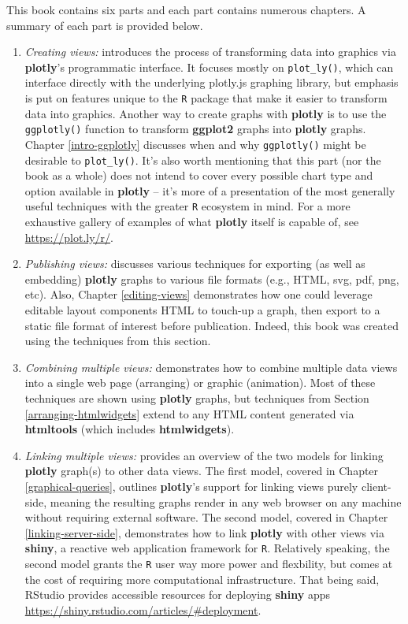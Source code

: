 \documentclass[
  12pt,
]{krantz}
\begin{document}
This book contains six parts and each part contains numerous chapters. A summary of each part is provided below.

\begin{enumerate}
\def\labelenumi{\arabic{enumi}.}
\item
  \emph{Creating views:} introduces the process of transforming data into graphics via \textbf{plotly}'s programmatic interface. It focuses mostly on \texttt{plot\_ly()}, which can interface directly with the underlying plotly.js graphing library, but emphasis is put on features unique to the \texttt{R} package that make it easier to transform data into graphics. Another way to create graphs with \textbf{plotly} is to use the \texttt{ggplotly()} function to transform \textbf{ggplot2} graphs into \textbf{plotly} graphs. Chapter \ref{intro-ggplotly} discusses when and why \texttt{ggplotly()} might be desirable to \texttt{plot\_ly()}. It's also worth mentioning that this part (nor the book as a whole) does not intend to cover every possible chart type and option available in \textbf{plotly} -- it's more of a presentation of the most generally useful techniques with the greater \texttt{R} ecosystem in mind. For a more exhaustive gallery of examples of what \textbf{plotly} itself is capable of, see \url{https://plot.ly/r/}.
\item
  \emph{Publishing views:} discusses various techniques for exporting (as well as embedding) \textbf{plotly} graphs to various file formats (e.g., HTML, svg, pdf, png, etc). Also, Chapter \ref{editing-views} demonstrates how one could leverage editable layout components HTML to touch-up a graph, then export to a static file format of interest before publication. Indeed, this book was created using the techniques from this section.
\item
  \emph{Combining multiple views:} demonstrates how to combine multiple data views into a single web page (arranging) or graphic (animation). Most of these techniques are shown using \textbf{plotly} graphs, but techniques from Section \ref{arranging-htmlwidgets} extend to any HTML content generated via \textbf{htmltools} (which includes \textbf{htmlwidgets}).
\item
  \emph{Linking multiple views:} provides an overview of the two models for linking \textbf{plotly} graph(s) to other data views. The first model, covered in Chapter \ref{graphical-queries}, outlines \textbf{plotly}'s support for linking views purely client-side, meaning the resulting graphs render in any web browser on any machine without requiring external software. The second model, covered in Chapter \ref{linking-server-side}, demonstrates how to link \textbf{plotly} with other views via \textbf{shiny}, a reactive web application framework for \texttt{R}. Relatively speaking, the second model grants the \texttt{R} user way more power and flexbility, but comes at the cost of requiring more computational infrastructure. That being said, RStudio provides accessible resources for deploying \textbf{shiny} apps \url{https://shiny.rstudio.com/articles/\#deployment}.

\end{enumerate}
\end{document}
